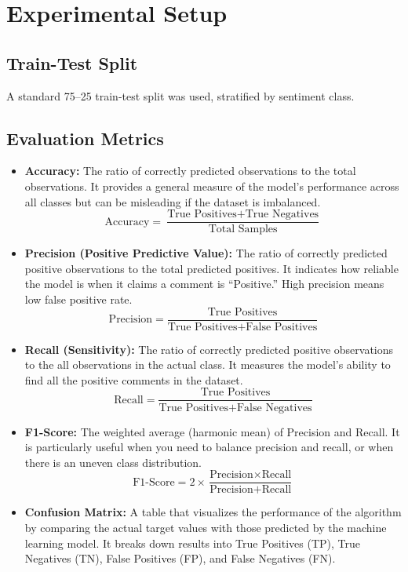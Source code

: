 \documentclass[11pt,a4paper]{article}
\begin{document}
\section{Experimental Setup}
\subsection{Train-Test Split}
A standard 75--25 train-test split was used, stratified by sentiment class.
\subsection*{Evaluation Metrics}

\begin{itemize}
    \item \textbf{Accuracy:} 
    The ratio of correctly predicted observations to the total observations. It provides a general measure of the model's performance across all classes but can be misleading if the dataset is imbalanced.
    \begin{equation}
        \text{Accuracy} = \frac{\text{True Positives} + \text{True Negatives}}{\text{Total Samples}}
    \end{equation}

    \item \textbf{Precision (Positive Predictive Value):} 
    The ratio of correctly predicted positive observations to the total predicted positives. It indicates how reliable the model is when it claims a comment is ``Positive.'' High precision means low false positive rate.
    \begin{equation}
        \text{Precision} = \frac{\text{True Positives}}{\text{True Positives} + \text{False Positives}}
    \end{equation}

    \item \textbf{Recall (Sensitivity):} 
    The ratio of correctly predicted positive observations to the all observations in the actual class. It measures the model's ability to find all the positive comments in the dataset.
    \begin{equation}
        \text{Recall} = \frac{\text{True Positives}}{\text{True Positives} + \text{False Negatives}}
    \end{equation}

    \item \textbf{F1-Score:} 
    The weighted average (harmonic mean) of Precision and Recall. It is particularly useful when you need to balance precision and recall, or when there is an uneven class distribution.
    \begin{equation}
        \text{F1-Score} = 2 \times \frac{\text{Precision} \times \text{Recall}}{\text{Precision} + \text{Recall}}
    \end{equation}

    \item \textbf{Confusion Matrix:} 
    A table that visualizes the performance of the algorithm by comparing the actual target values with those predicted by the machine learning model. It breaks down results into True Positives (TP), True Negatives (TN), False Positives (FP), and False Negatives (FN).
\end{itemize}
\end{document}
